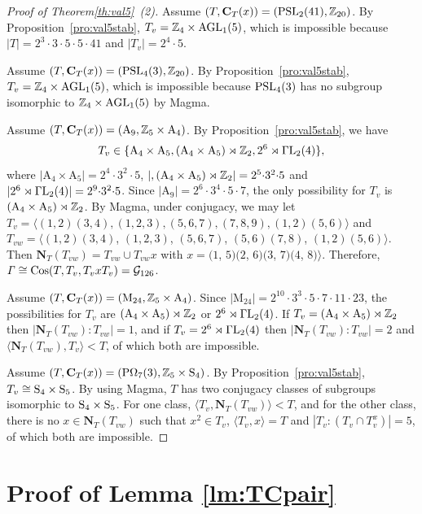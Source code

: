 \documentclass[12pt,reqno]{amsart}
\newcommand\A{\mathrm{A}} \newcommand\AGL{\mathrm{AGL}} \newcommand\AGammaL{\mathrm{A\Gamma L}} \newcommand\Alt{\mathrm{Alt}} \newcommand\ASL{\mathrm{ASL}} \newcommand\ASigmaL{\mathrm{A \Sigma L}} \newcommand\Aut{\mathrm{Aut}}
\def\C{\mathbf{C}}   \newcommand\Cay{\mathrm{Cay}}   \newcommand\Cos{\mathrm{Cos}} \newcommand{\CGammaSp}{\mathrm{C\Gamma Sp}}
\newcommand\M{\mathrm{M}} \newcommand{\magma}{{\sc Magma}} \renewcommand \mod{{\rm mod~}}
\newcommand\N{\mathbf{N}}
\newcommand{\cG}{\mathcal{G}}
\numberwithin {equation} {section}
\begin{document}
\begin{proof}[Proof of Theorem\ref{th:val5}~{\rm(2)}]
Assume $(T,\C_T(x))=(\PSL_2(41), \ZZ_{20})$. By Proposition~\ref{pro:val5stab}, $T_v=\ZZ_4 \times \AGL_1(5)$, which is impossible because $|T|=2^3{\cdot}3{\cdot}5{\cdot}5{\cdot}41$ and $|T_v|=2^4{\cdot}5$.

Assume $(T,\C_T(x))=(\PSL_4(3), \ZZ_{20})$. By Proposition~\ref{pro:val5stab}, $T_v=\ZZ_4 \times \AGL_1(5)$, which is impossible because $\mathrm{PSL}_4(3)$ has no subgroup isomorphic to $ \ZZ_4 \times \AGL_1(5)$ by {\sc Magma}.



Assume $(T,\C_T(x))=(\A_9, \ZZ_5\times \A_{4})$. By Proposition~\ref{pro:val5stab}, we have
\[ T_v\in \{ \A_4 \times \A_5,(\A_4 \times \A_5)\rtimes\ZZ_2,2^6\rtimes\GammaL_2(4)\}, \]
  where $|\A_4 \times \A_5|=2^4{\cdot}3^2{\cdot}5$,   $|,(\A_4 \times \A_5)\rtimes\ZZ_2|=2^5{\cdot}3^2{\cdot}5$ and  $|2^6\rtimes\mathrm{\Gamma L}_2(4)|=2^9{\cdot}3^2{\cdot}5$.
Since $|\A_9|=2^6{\cdot}3^4{\cdot}5{\cdot}7$, the only possibility for  $ T_v $ is $(\A_4 \times \A_5)\rtimes \ZZ_2$. By {\sc Magma}, under conjugacy, we may let $T_v= \langle (1,2)(3,4), (1,2,3), (5,6,7), (7,8,9), (1,2)(5,6) \rangle$ and $T_{vw}=\langle (1,2)(3,4)$, $(1,2,3)$, $(5,6,7)$, $(5,6)(7,8)$, $(1,2)(5,6)\rangle$. Then $\N_T(T_{vw})=T_{vw}\cup T_{vw}x$ with $x=(1$, $5)(2$, $6)(3$, $7)(4$, $8)\rangle$. Therefore, $\Ga\cong \Cos(T,T_v,T_v xT_v)=\cG_{126}$.

Assume $(T,\C_T(x))=(\M_{24}, \ZZ_{5}\times \A_4)$. Since $|\M_{24}|=2^{10}{\cdot}3^3{\cdot}5{\cdot}7{\cdot}11{\cdot}23$, the possibilities for $ T_v $ are $(\A_4 \times \A_5)\rtimes \ZZ_2$ or $2^6 \rtimes  \mathrm{\Gamma L}_2 (4)$. If $T_v=(\A_4 \times \A_5)\rtimes \ZZ_2$ then $|\N_T(T_{vw}):T_{vw}|=1$, and if $T_v=2^6 \rtimes  \mathrm{\Gamma L}_2 (4)$ then $|\N_T(T_{vw}):T_{vw}|=2$ and $\langle \N_T(T_{vw}),T_v\rangle<T $,
of which both are impossible.

Assume $(T,\C_T(x))=(\POmega_7(3), \ZZ_{5} \times \Sy_4)$. By Proposition~\ref{pro:val5stab}, $ T_v\cong \mathrm{S}_4 \times \mathrm{S}_5$. By using {\sc Magma}, $T$ has two conjugacy classes of subgroups isomorphic to $\mathrm{S}_4 \times \mathrm{S}_5$. For one class, $\langle T_v,\N_T(T_{vw})\rangle<T$, and for the other class, there is no $x \in \N_T(T_{vw}) $ such that  $x^2 \in T_v$, $\langle T_v,x\rangle=T$ and $|T_v:(T_v \cap T_v^x)|=5$, of which both are impossible.
\end{proof}

\section{Proof of Lemma \ref{lm:TCpair}}\label{sec:proofTC}
\end{document}
